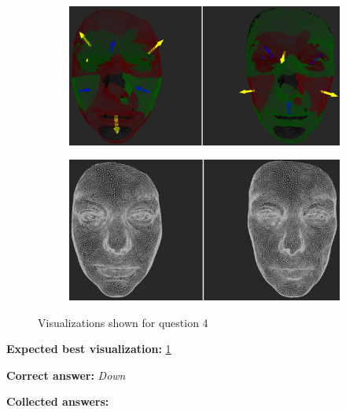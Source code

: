 \begin{figure}[h]
\begin{subfigure}{0.4\textwidth}
\includegraphics[width=\textwidth]{./screenshots/pair9.PNG}
\caption{}
\label{fig:study-3-9}
\end{subfigure}
\quad
\begin{subfigure}{0.4\textwidth}
\includegraphics[width=\textwidth]{./screenshots/pair6.PNG}
\caption{}
\label{fig:study-3-6}
\end{subfigure}
\caption{Visualizations shown for question 4}
\end{figure}
\medskip

{\bf Expected best visualization:} \ref{fig:study-3-9}
\medskip

{\bf Correct answer:} {\it Down}
\medskip

{\bf Collected answers:}

